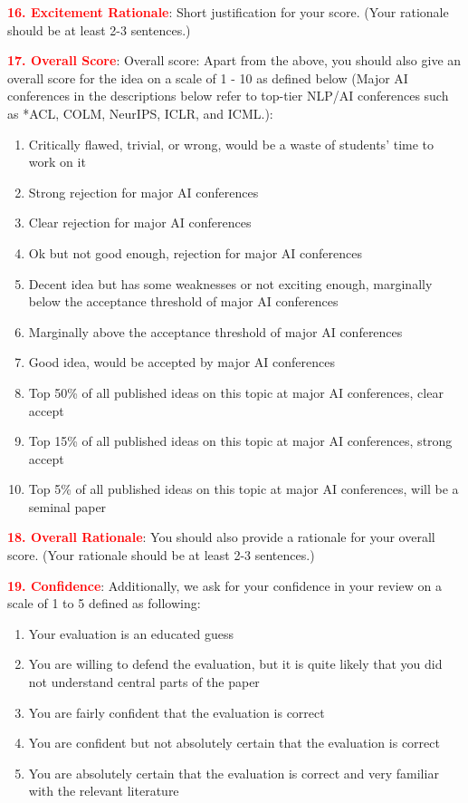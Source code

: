 \textbf{\textcolor{red}{16. Excitement Rationale}}: Short justification for your score. (Your rationale should be at least 2-3 sentences.)



\textbf{\textcolor{red}{17. Overall Score}}: Overall score:  Apart from the above, you should also give an overall score for the idea on a scale of 1 - 10 as defined below (Major AI conferences in the descriptions below refer to top-tier NLP/AI conferences such as *ACL, COLM, NeurIPS, ICLR, and ICML.):

\begin{enumerate}
    \item Critically flawed, trivial, or wrong, would be a waste of students’ time to work on it
    \item Strong rejection for major AI conferences
    \item Clear rejection for major AI conferences
    \item Ok but not good enough, rejection for major AI conferences
    \item Decent idea but has some weaknesses or not exciting enough, marginally below the acceptance threshold of major AI conferences
    \item Marginally above the acceptance threshold of major AI conferences
    \item Good idea, would be accepted by major AI conferences
    \item Top 50\% of all published ideas on this topic at major AI conferences, clear accept
    \item Top 15\% of all published ideas on this topic at major AI conferences, strong accept
    \item Top 5\% of all published ideas on this topic at major AI conferences, will be a seminal paper
\end{enumerate}

\textbf{\textcolor{red}{18. Overall Rationale}}: You should also provide a rationale for your overall score. (Your rationale should be at least 2-3 sentences.)

\newpage 


\textbf{\textcolor{red}{19. Confidence}}: Additionally, we ask for your confidence in your review on a scale of 1 to 5 defined as following:

\begin{enumerate}
    \item Your evaluation is an educated guess
    \item You are willing to defend the evaluation, but it is quite likely that you did not understand central parts of the paper
    \item You are fairly confident that the evaluation is correct
    \item You are confident but not absolutely certain that the evaluation is correct
    \item You are absolutely certain that the evaluation is correct and very familiar with the relevant literature
\end{enumerate}


